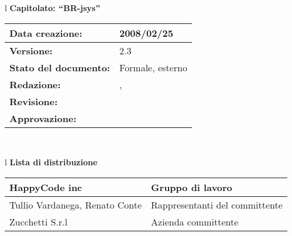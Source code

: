 


\newcommand{\lv}{ 2.3 } %
\newcommand{\dt}{ Manuale Utente }%
\newcommand{\Grammatica}{} %

\begin{center}
\thispagestyle{plain}
\begin{table}[htbp]
\large{
\begin{tabular}{l}
\Large{\textbf{\textsf{Capitolato: ``BR-jsys''}}} \\
\begin{tabular}{|p{6cm}|p{6cm}|} \hline
\textbf{Data creazione:} & 2008/02/25 \\ \hline
\textbf{Versione:} & \lv \\ \hline
\textbf{Stato del documento:} & Formale, esterno \\ \hline
\textbf{Redazione:} &  \AT, \LA \\ \hline
\textbf{Revisione:} & \FC \\ \hline
\textbf{Approvazione:} & \MM \\ \hline
\end{tabular} \\
\end{tabular}
}
\end{table}

\begin{table}[hbtp]
\large{
\begin{tabular}{l}
\Large{\textbf{\textsf{Lista di distribuzione}}} \\

\begin{tabular}{|p{6cm}|p{6cm}|} \hline
{HappyCode inc}& Gruppo di lavoro\\ \hline
{Tullio Vardanega, Renato Conte}& Rappresentanti del committente \\ \hline
{Zucchetti S.r.l}& Azienda committente\\ \hline
\end{tabular} \\
\end{tabular}
}
\end{table}
\begin{table}[hbtp]


\end{table}
\end{center}
